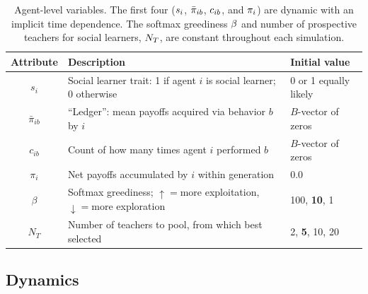\documentclass[letterpaper,11.5pt]{scrartcl}
\begin{document}
\begin{table}[h]
  \caption{Agent-level variables. The first four ($\protect s_i$, $\protect
    \bar\pi_{ib}$, $\protect c_{ib}$,
  and $\protect \pi_i$) are dynamic with an implicit time dependence. The softmax
greediness $\protect \beta$ and number of prospective teachers for social learners,
$\protect N_T$, are constant throughout each simulation.}
    \label{tab:modelParameters}
    \centering %
    \begin{tabular}{cp{4.0in}p{1.25in}} \toprule

        Attribute & Description & Initial value \\ 

        \midrule  

        $s_i$  & Social learner trait: 1 if agent $i$ is social learner; 0 otherwise & 0
        or 1 equally likely \\

        $\bar\pi_{ib}$ & ``Ledger'': mean payoffs acquired via behavior $b$ by $i$ 
                       & $B$-vector of zeros \\

        $c_{ib}$ & Count of how many times agent $i$ performed $b$ 
              & $B$-vector of zeros \\

        $\pi_i$ & Net payoffs accumulated by $i$ within generation & 0.0 \\

        $\beta$ & Softmax greediness; $\uparrow=$more exploitation, $\downarrow=$more
                    exploration 
               & 100, \textbf{10}, 1 \\
        
        $N_T$    & Number of teachers to pool, from which best selected 
                 & 2, \textbf{5}, 10, 20  \\

        \bottomrule
    \end{tabular}
\end{table}



\subsection{Dynamics}
\end{document}
